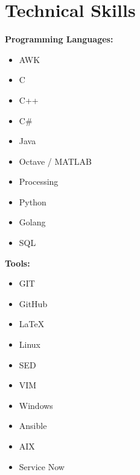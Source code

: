 \section{Technical Skills}
\textbf{Programming Languages:}
\begin{multicols}{3}
	\begin{itemize}
		\item AWK
		\item C
		\item C++
		\item C\#
		\item Java
		\item Octave / MATLAB
		\item Processing
		\item Python
		\item Golang
		\item SQL
	\end{itemize}
\end{multicols}
\textbf{Tools:}
\begin{multicols}{3}
	\begin{itemize}
	\item GIT
	\item GitHub
	\item \LaTeX
	\item Linux
	\item SED
	\item VIM
	\item Windows
	\item Ansible
	\item AIX
	\item Service Now
	\end{itemize}
\end{multicols}

